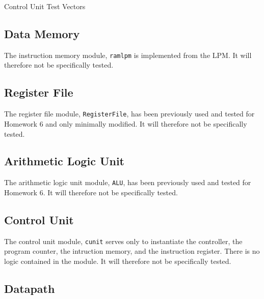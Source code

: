 \begin{table}[htbp]
    \centering
    \caption{Control Unit Test Vectors\label{tab:ir_vectors}}
\end{table}


\subsection{Data Memory} %
\label{sub:data_memory}

The instruction memory module, \verb|ramlpm| is implemented from the LPM.
It will therefore not be specifically tested.

\subsection{Register File} %
\label{sub:register_file}

The register file module, \verb|RegisterFile|, has been previously used and tested for Homework 6 and only minimally modified.
It will therefore not be specifically tested.

\subsection{Arithmetic Logic Unit} %
\label{sub:arithmetic_logic_unit}

The arithmetic logic unit module, \verb|ALU|, has been previously used and tested for Homework 6.
It will therefore not be specifically tested.

\subsection{Control Unit} %
\label{sub:control_unit_pro}

The control unit module, \verb|cunit| serves only to instantiate the controller, the program counter, the intruction memory, and the instruction register.
There is no logic contained in the module.
It will therefore not be specifically tested.


\subsection{Datapath} %
\label{sub:datapath_pro}

